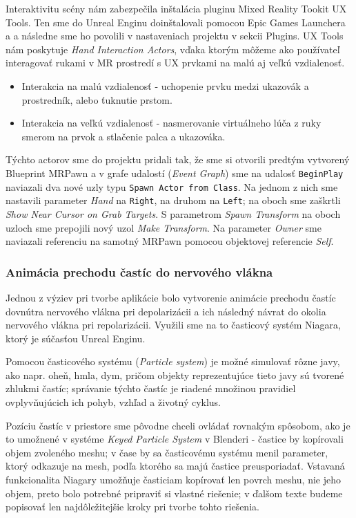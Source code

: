 Interaktivitu scény nám zabezpečila inštalácia pluginu Mixed Reality Tookit UX Tools. Ten sme do Unreal Enginu doinštalovali pomocou Epic Games Launchera a a následne sme ho povolili v nastaveniach
projektu v sekcii Plugins. UX Tools nám poskytuje \emph{Hand Interaction Actors}, vďaka ktorým môžeme ako používateľ interagovať rukami v MR prostredí s UX prvkami na malú aj veľkú vzdialenosť.
\begin{itemize}
  \item Interakcia na malú vzdialenosť - uchopenie prvku medzi ukazovák a prostredník, alebo ťuknutie prstom.
  \item Interakcia na veľkú vzdialenosť - nasmerovanie virtuálneho lúča z ruky smerom na prvok a stlačenie palca a ukazováka.
\end{itemize}
Týchto actorov sme do projektu pridali tak, že sme si otvorili predtým vytvorený Blueprint MRPawn a v grafe udalostí (\emph{Event Graph}) sme na udalosť \texttt{BeginPlay} naviazali dva nové uzly
typu \texttt{Spawn Actor from Class}. Na jednom z nich sme nastavili parameter \emph{Hand} na \texttt{Right}, na druhom na \texttt{Left}; na oboch sme zaškrtli \emph{Show Near Cursor on Grab Targets}.
S parametrom \emph{Spawn Transform} na oboch uzloch sme prepojili nový uzol \emph{Make Transform}. Na parameter \emph{Owner} sme naviazali referenciu na samotný MRPawn pomocou objektovej referencie
\emph{Self}.

\subsubsection{Animácia prechodu častíc do nervového vlákna}
Jednou z výziev pri tvorbe aplikácie bolo vytvorenie animácie prechodu častíc dovnútra nervového vlákna pri depolarizácii a ich následný návrat do okolia nervového vlákna pri repolarizácii. Využili sme 
na to časticový systém Niagara, ktorý je súčasťou Unreal Enginu. 

Pomocou časticového systému (\emph{Particle system}) je možné simulovať rôzne javy, ako napr. oheň, hmla, dym, pričom objekty reprezentujúce tieto javy sú tvorené zhlukmi častíc; správanie týchto častíc
je riadené množinou pravidiel ovplyvňujúcich ich pohyb, vzhľad a životný cyklus.

Pozíciu častíc v priestore sme pôvodne chceli ovládať rovnakým spôsobom, ako je to umožnené v systéme \emph{Keyed Particle System} v Blenderi - častice by kopírovali objem zvoleného meshu; v čase by 
sa časticovému systému menil parameter, ktorý odkazuje na mesh, podľa ktorého sa majú častice preusporiadať. Vstavaná funkcionalita Niagary umožňuje časticiam kopírovať len povrch meshu, nie jeho objem, 
preto bolo potrebné pripraviť si vlastné riešenie; v ďalšom texte budeme popisovať len najdôležitejšie kroky pri tvorbe tohto riešenia. 

